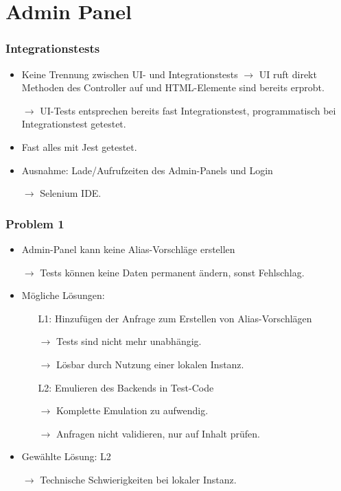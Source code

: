 \section{Admin Panel}

\begin{frame}\frametitle{Integrationstests}
    \begin{itemize}
        \item Keine Trennung zwischen UI- und Integrationstests $\rightarrow$ UI ruft direkt Methoden des Controller auf 
            und HTML-Elemente sind bereits erprobt. 
        \item[$\rightarrow$] UI-Tests entsprechen bereits fast Integrationstest, programmatisch bei Integrationstest getestet.
        \item Fast alles mit Jest getestet.
        \item Ausnahme: Lade/Aufrufzeiten des Admin-Panels und Login
        \item[$\rightarrow$] Selenium IDE.
    \end{itemize}
\end{frame}

\begin{frame}\frametitle{Problem 1}
    \begin{itemize}
        \item Admin-Panel kann keine Alias-Vorschläge erstellen
        \item[$\rightarrow$] Tests können keine Daten permanent ändern, sonst Fehlschlag.
        \item Mögliche Lösungen: \begin{itemize}
            \item[L1:] Hinzufügen der Anfrage zum Erstellen von Alias-Vorschlägen
            \item[$\rightarrow$] Tests sind nicht mehr unabhängig.
            \item[$\rightarrow$] Lösbar durch Nutzung einer lokalen Instanz. 
            \item[L2:] Emulieren des Backends in Test-Code
            \item[$\rightarrow$] Komplette Emulation zu aufwendig.
            \item[$\rightarrow$] Anfragen nicht validieren, nur auf Inhalt prüfen.
        \end{itemize} 
        \pause
        \item Gewählte Lösung: L2
        \item[$\rightarrow$] Technische Schwierigkeiten bei lokaler Instanz.
    \end{itemize}
\end{frame}

